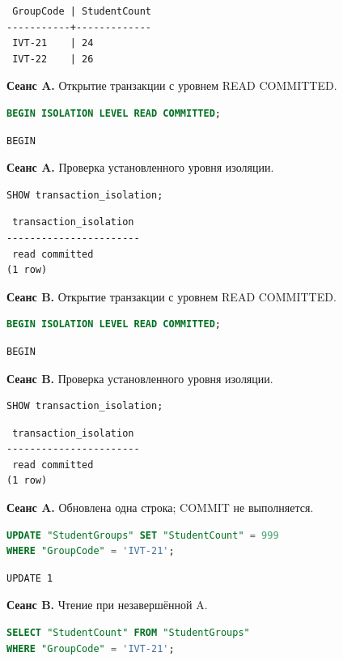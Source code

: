 \documentclass[12pt,a4paper]{article}
\begin{document}
\begin{lstlisting}
 GroupCode | StudentCount
-----------+-------------
 IVT-21    | 24
 IVT-22    | 26
\end{lstlisting}

\textbf{Сеанс A.} Открытие транзакции с уровнем READ COMMITTED.
\begin{lstlisting}[language=SQL]
BEGIN ISOLATION LEVEL READ COMMITTED;
\end{lstlisting}

\begin{lstlisting}
BEGIN
\end{lstlisting}

\textbf{Сеанс A.} Проверка установленного уровня изоляции.
\begin{lstlisting}[language=SQL]
SHOW transaction_isolation;
\end{lstlisting}

\begin{lstlisting}
 transaction_isolation
-----------------------
 read committed
(1 row)
\end{lstlisting}

\textbf{Сеанс B.} Открытие транзакции с уровнем READ COMMITTED.
\begin{lstlisting}[language=SQL]
BEGIN ISOLATION LEVEL READ COMMITTED;
\end{lstlisting}

\begin{lstlisting}
BEGIN
\end{lstlisting}

\textbf{Сеанс B.} Проверка установленного уровня изоляции.
\begin{lstlisting}[language=SQL]
SHOW transaction_isolation;
\end{lstlisting}

\begin{lstlisting}
 transaction_isolation
-----------------------
 read committed
(1 row)
\end{lstlisting}

\textbf{Сеанс A.} Обновлена одна строка; COMMIT не выполняется.
\begin{lstlisting}[language=SQL]
UPDATE "StudentGroups" SET "StudentCount" = 999
WHERE "GroupCode" = 'IVT-21';
\end{lstlisting}

\begin{lstlisting}
UPDATE 1
\end{lstlisting}

\textbf{Сеанс B.} Чтение при незавершённой A.
\begin{lstlisting}[language=SQL]
SELECT "StudentCount" FROM "StudentGroups"
WHERE "GroupCode" = 'IVT-21';
\end{lstlisting}
\end{document}
